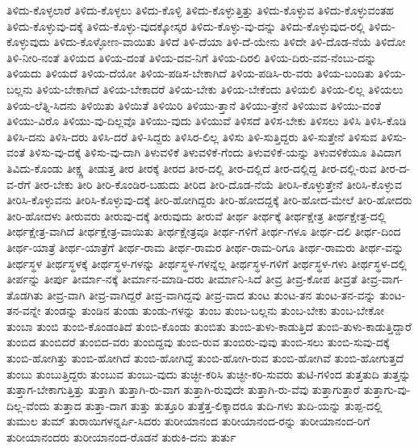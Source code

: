 {ತಿಳಿದು-ಕೊಳ್ಳಲಾರೆ
ತಿಳಿದು-ಕೊಳ್ಳಲು
ತಿಳಿದು-ಕೊಳ್ಳಿ
ತಿಳಿದು-ಕೊಳ್ಳುತ್ತಿತ್ತು
ತಿಳಿದು-ಕೊಳ್ಳುವ
ತಿಳಿದು-ಕೊಳ್ಳುವಂತಹ
ತಿಳಿದು-ಕೊಳ್ಳುವು-ದಕ್ಕೆ
ತಿಳಿದು-ಕೊಳ್ಳು-ವುದಕ್ಕೋಸ್ಕರ
ತಿಳಿದು-ಕೊಳ್ಳು-ವು-ದನ್ನು
ತಿಳಿದು-ಕೊಳ್ಳುವುದ-ರಲ್ಲಿ
ತಿಳಿದು-ಕೊಳ್ಳುವುದು
ತಿಳಿದು-ಕೊಳ್ಳೋಣ-ವಾಯಿತು
ತಿಳಿದೆ
ತಿಳಿ-ದೆಯಾ
ತಿಳಿ-ದೆ-ಯೇನು
ತಿಳಿದೇ
ತಿಳಿ-ದೊಡ-ನೆಯೆ
ತಿಳಿದೋ
ತಿಳಿ-ನೀರಿ-ನಂತೆ
ತಿಳಿಯದ
ತಿಳಿಯ-ದಂತೆ
ತಿಳಿಯ-ದವ-ನಿಗೆ
ತಿಳಿಯ-ದಿರಲಿ
ತಿಳಿಯ-ದಿರು-ವವ-ನೆಂಬು-ದನ್ನು
ತಿಳಿಯದು
ತಿಳಿಯದೆ
ತಿಳಿಯ-ದೆಯೋ
ತಿಳಿಯ-ಪಡಿಸ-ಬೇಕಾಗಿದೆ
ತಿಳಿಯ-ಪಡಿಸಿ-ರು-ವರು
ತಿಳಿಯ-ಬಂದಿತು
ತಿಳಿಯ-ಬಲ್ಲನು
ತಿಳಿಯ-ಬೇಕಾಗಿದೆ
ತಿಳಿಯ-ಬೇಕಾದರೆ
ತಿಳಿಯ-ಬೇಕು
ತಿಳಿಯ-ಬೇಕೆಂದು
ತಿಳಿಯಲಿ
ತಿಳಿಯ-ಲಿಲ್ಲ
ತಿಳಿಯಲು
ತಿಳಿಯ-ಲೆತ್ನಿ-ಸಿದನು
ತಿಳಿಯಿತು
ತಿಳಿಯಿತೆ
ತಿಳಿಯಿರಿ
ತಿಳಿಯು-ತ್ತಾನೆ
ತಿಳಿಯು-ತ್ತೇನೆ
ತಿಳಿಯುವ
ತಿಳಿಯು-ವಂತೆ
ತಿಳಿಯು-ವಿರೊ
ತಿಳಿಯು-ವು-ದಿಲ್ಲವೊ
ತಿಳಿಯು-ವುದು
ತಿಳಿಯುವೆ
ತಿಳಿಸದೆ
ತಿಳಿಸ-ಬೇಕು
ತಿಳಿಸಲು
ತಿಳಿಸಿ
ತಿಳಿಸಿ-ಕೊಡಿ
ತಿಳಿಸಿ-ದನು
ತಿಳಿಸಿ-ದರು
ತಿಳಿಸಿ-ದರೆ
ತಿಳಿ-ಸಿದ್ದರು
ತಿಳಿಸಿರ-ಲಿಲ್ಲ
ತಿಳಿಸು
ತಿಳಿ-ಸುತ್ತಿದ್ದರು
ತಿಳಿ-ಸುತ್ತೇನೆ
ತಿಳಿಸುವ
ತಿಳಿಸು-ವಂತೆ
ತಿಳಿಸು-ವು-ದಕ್ಕೆ
ತಿಳಿಸು-ವು-ದಾಗಿ
ತಿಳುವಳಿಕೆ
ತಿಳುವಳಿಕೆ-ಗೆಂದು
ತಿಳುವಳಿಕೆ-ಯನ್ನು
ತಿಳುವಳಿಕೆಯೂ
ತಿವಿದಾಗ
ತಿವಿದು-ಕೊಂಡು
ತೀಕ್ಷ್ಣ
ತೀಡುತ್ತ
ತೀರ
ತೀರಕ್ಕೆ
ತೀರದ
ತೀರ-ದಲ್ಲಿ
ತೀರ-ದಲ್ಲಿದೆ
ತೀರ-ದಲ್ಲಿದ್ದ
ತೀರ-ದಲ್ಲಿ-ರುವ
ತೀರ-ದ-ವ-ರೆಗೆ
ತೀರ-ಬೇಕು
ತೀರಿ
ತೀರಿ-ಕೊಂಡಿರ-ಬಹುದು
ತೀರಿದ
ತೀರಿ-ದೊಡ-ನೆಯೆ
ತೀರಿಸಿ-ಕೊಳ್ಳುತ್ತೇನೆ
ತೀರಿಸಿ-ಕೊಳ್ಳುವ
ತೀರಿಸಿ-ಕೊಳ್ಳುವನು
ತೀರಿಸಿ-ಕೊಳ್ಳುವು-ದಕ್ಕೆ
ತೀರಿ-ಹೋಗಿದ್ದರು
ತೀರಿ-ಹೋದದ್ದಕ್ಕೆ
ತೀರಿ-ಹೋದ-ಮೇಲೆ
ತೀರಿ-ಹೋದರು
ತೀರಿ-ಹೋದಳು
ತೀರುವರು
ತೀರುವು-ದಕ್ಕೆ
ತೀರುವುದು
ತೀರುವೆ
ತೀರ್ಥ
ತೀರ್ಥಕ್ಕೆ
ತೀರ್ಥಕ್ಷೇತ್ರ
ತೀರ್ಥಕ್ಷೇತ್ರ-ದಲ್ಲಿ
ತೀರ್ಥಕ್ಷೇತ್ರ-ವಾಗಿದೆ
ತೀರ್ಥಕ್ಷೇತ್ರ-ವಾಯಿತು
ತೀರ್ಥಕ್ಷೇತ್ರವೂ
ತೀರ್ಥ-ಗಳಿಗೆ
ತೀರ್ಥ-ಗಳೂ
ತೀರ್ಥ-ದಲಿ
ತೀರ್ಥ-ದಿಂದ
ತೀರ್ಥ-ಯಾತ್ರೆ
ತೀರ್ಥ-ಯಾತ್ರೆಗೆ
ತೀರ್ಥ-ರಾಮ
ತೀರ್ಥ-ರಾಮರ
ತೀರ್ಥ-ರಾಮ-ರಿಗೂ
ತೀರ್ಥ-ರಾಮರು
ತೀರ್ಥ-ವನ್ನು
ತೀರ್ಥಸ್ಥಳ
ತೀರ್ಥಸ್ಥಳಕ್ಕೆ
ತೀರ್ಥಸ್ಥಳ-ಗಳನ್ನು
ತೀರ್ಥಸ್ಥಳ-ಗಳನ್ನೆಲ್ಲ
ತೀರ್ಥಸ್ಥಳ-ಗಳಿಗೆ
ತೀರ್ಥಸ್ಥಳ-ಗಳು
ತೀರ್ಥಸ್ಥಳ-ದಲ್ಲಿ
ತೀರ್ಪನ್ನು
ತೀರ್ಪು
ತೀರ್ಮಾ-ನಕ್ಕೆ
ತೀರ್ಮಾನ-ಮಾಡಿ-ದರು
ತೀರ್ಮಾನಿ-ಸಿದೆ
ತೀವ್ರ
ತೀವ್ರ-ಕೋಪ
ತೀವ್ರತೆ
ತೀವ್ರ-ವಾಗ-ತೊಡಗಿತು
ತೀವ್ರ-ವಾಗಿ
ತೀವ್ರ-ವಾಗಿದ್ದರೆ
ತೀವ್ರ-ವಾಗಿದ್ದವು
ತೀವ್ರ-ವಾದ
ತುಂಟ
ತುಂಟ-ತನ
ತುಂಟ-ತನ-ವನ್ನು
ತುಂಟ-ತನ-ವನ್ನೇ
ತುಂಡನ್ನು
ತುಂಡಿನ
ತುಂಡು
ತುಂಡು-ಗಳನ್ನು
ತುಂಬ
ತುಂಬ-ಬಲ್ಲನು
ತುಂಬ-ಬೇಕು
ತುಂಬ-ಬೇಕೋ
ತುಂಬಾ
ತುಂಬಿ
ತುಂಬಿ-ಕೊಂಡಂತಿದೆ
ತುಂಬಿ-ಕೊಂಡು
ತುಂಬಿತು
ತುಂಬಿ-ತುಳು-ಕಾಡುತ್ತಿದೆ
ತುಂಬಿ-ತುಳು-ಕಾಡುತ್ತಿದ್ದಾರೆ
ತುಂಬಿದ
ತುಂಬಿದರೆ
ತುಂಬಿದ-ವರು
ತುಂಬಿದ್ದವು
ತುಂಬಿ-ರುವ
ತುಂಬಿರು-ವುವು
ತುಂಬಿ-ಸಲು
ತುಂಬಿ-ಸುವು-ದಕ್ಕೆ
ತುಂಬಿ-ಹೋಗಿತ್ತು
ತುಂಬಿ-ಹೋಗಿದೆ
ತುಂಬಿ-ಹೋಗಿದ್ದೆ
ತುಂಬಿ-ಹೋಗಿ-ರುವ
ತುಂಬಿ-ಹೋಗಿವೆ
ತುಂಬಿ-ಹೋಗುತ್ತದೆ
ತುಂಬು
ತುಂಬುತ್ತಿದ್ದರು
ತುಂಬುವ
ತುಂಬು-ವುದು
ತುಚ್ಛೀ-ಕರಿಸಿ
ತುಚ್ಛೀ-ಕರಿ-ಸುವರು
ತುಟಿ-ಗಳಿಂದ
ತುತ್ತತುದಿ
ತುತ್ತನ್ನು
ತುತ್ತಾಗ-ಬೇಕಾಗುತ್ತಿತ್ತು
ತುತ್ತಾಗಿ
ತುತ್ತಾಗಿ-ರು-ವಾಗ
ತುತ್ತಾಗಿ-ರುವುದೇ
ತುತ್ತಾಗಿ-ರು-ವೆವು
ತುತ್ತಾಗುತ್ತಾರೆ
ತುತ್ತಾಗು-ವು-ದಿಲ್ಲ-ವೆಂದು
ತುತ್ತಾದ
ತುತ್ತಾ-ದಾಗ
ತುತ್ತು
ತುತ್ತೂರಿ
ತುತ್ತೆತ್ತ-ಲಿಕ್ಕಾದರೂ
ತುದಿ-ಗಳು
ತುದಿ-ಯನ್ನು
ತುಪ್ಪ-ದಲ್ಲಿ
ತುಮುಲ
ತುಮ್
ತುರಾಯಿಗಳನ್ನರ್ಪಿ-ಸಿದರು
ತುರೀಯಾನಂದ
ತುರೀಯಾನಂದ-ರನ್ನು
ತುರೀಯಾನಂದ-ರಿಗೆ
ತುರೀಯಾನಂದರು
ತುರೀಯಾನಂದ-ರೊಡನೆ
ತುರುಕಿ-ದನು
ತುರ್ತು
}
